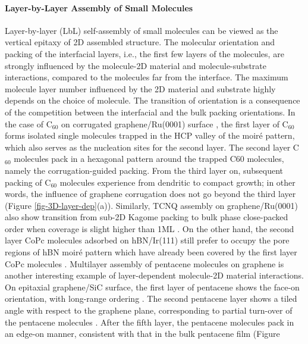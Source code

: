 \paragraph{Layer-by-Layer Assembly of Small Molecules}
\label{sec:org2cdd8f0}

Layer-by-layer (LbL) self-assembly of small molecules can be viewed as
the vertical epitaxy of 2D assembled structure. The molecular
orientation and packing of the interfacial layers, i.e., the first few
layers of the molecules, are strongly influenced by the molecule-2D
material and molecule-substrate interactions, compared to the
molecules far from the interface.  The maximum molecule layer number
influenced by the 2D material and substrate highly depends on the
choice of molecule. The transition of orientation is a consequence of
the competition between the interfacial and the bulk packing
orientations. In the case of C\(_{\text{60}}\) on corrugated graphene/Ru(0001)
surface \cite{Lu_2012_c60_gr_moire}, the first layer of C\(_{\text{60}}\) forms
isolated single molecules trapped in the HCP valley of the moiré
pattern, which also serves as the nucleation sites for the second
layer. The second layer C\(_{\text{60}}\) molecules pack in a hexagonal pattern
around the trapped C60 molecules, namely the corrugation-guided
packing. From the third layer on, subsequent packing of C\(_{\text{60}}\)
molecules experience from dendritic to compact growth; in other words,
the influence of graphene corrugation does not go beyond the third
layer (Figure \ref{fig-3D-layer-dep}(a)). Similarly, TCNQ assembly on
graphene/Ru(0001) also show transition from sub-2D Kagome packing to
bulk phase close-packed order when coverage is slight higher than 1ML
\cite{Maccariello_2014_TCNQ_gr_Ru}.  On the other hand, the second layer
CoPc molecules adsorbed on hBN/Ir(111) still prefer to occupy the pore
regions of hBN moiré pattern which have already been covered by the
first layer CoPc molecules \cite{Schulz_2013_copc_hbn_moire}. Multilayer
assembly of pentacene molecules on graphene is another interesting
example of layer-dependent molecule-2D material interactions. On
epitaxial graphene/SiC surface, the first layer of pentacene shows the
face-on orientation, with long-range ordering
\cite{Jung_2014_pentacene}. The second pentacene layer shows a tiled
angle with respect to the graphene plane, corresponding to partial
turn-over of the pentacene molecules
\cite{Chen_2008_transition_pentacene}. After the fifth layer, the
pentacene molecules pack in an edge-on manner, consistent with that in
the bulk pentacene film \cite{Ruiz_2004_bulk_pentacene} (Figure
